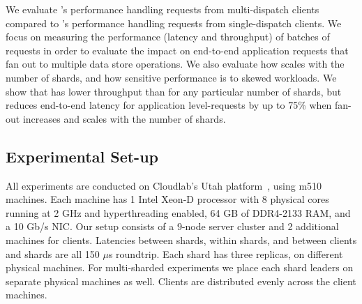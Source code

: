 We evaluate \system's performance handling requests from multi-dispatch clients
compared to \mpaxos's performance handling requests from single-dispatch
clients.  We focus on measuring the performance (latency and throughput) of
batches of requests in order to evaluate the impact on end-to-end application
requests that fan out to multiple data store operations. We also evaluate how
\system scales with the number of shards, and how sensitive performance is to
skewed workloads.
We show that \system{} has lower throughput than \mpaxos for any particular
number of shards, but reduces end-to-end latency for application level-requests
by up to 75\% when fan-out increases and scales with the number of shards.

\subsection{Experimental Set-up}
All experiments are conducted on Cloudlab's Utah platform~\cite{cloudlab}, using
m510 machines.  Each machine has 1 Intel Xeon-D processor with 8 physical cores
running at 2 GHz and hyperthreading enabled, 64 GB of DDR4-2133 RAM, and a 10
Gb/s NIC\@.  Our setup consists of a 9-node server cluster and 2 additional
machines for clients. Latencies between shards, within shards, and between
clients and shards are all 150 $\mu$s roundtrip.  Each shard has three replicas,
on different physical machines. For multi-sharded experiments we place each
shard leaders on separate physical machines as well. Clients are distributed
evenly across the client machines.

